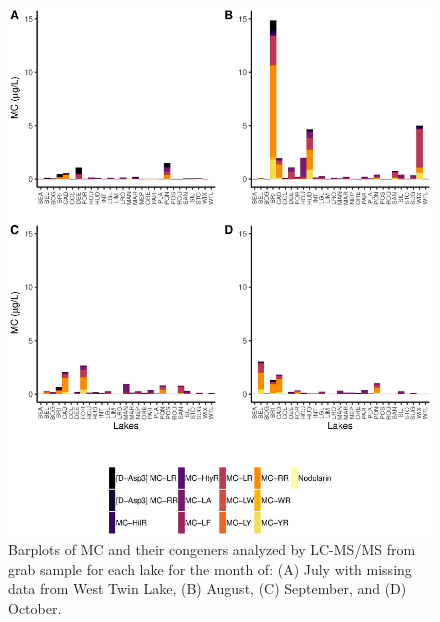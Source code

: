 \begin{figure}[p] 
	\includegraphics[width=\textwidth]{figures/month}
	\caption{
Barplots of MC and their congeners analyzed by LC-MS/MS from grab sample for each lake for the month of: 
(A) July with missing data from West Twin Lake, 
(B) August,
(C) September, and
(D) October. 
}
	\label{fig:month} 
\end{figure}


